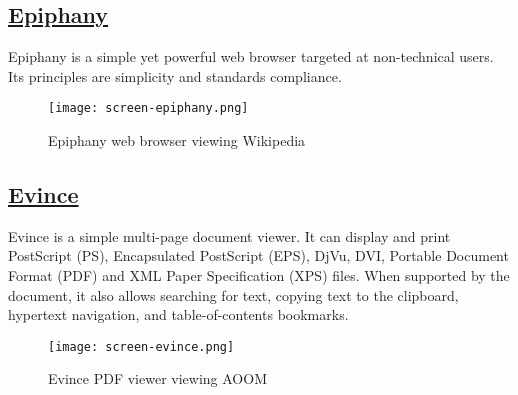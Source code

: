 %
% 
%

\subsection{\href{https://wiki.gnome.org/Apps/Web}{Epiphany}}

 Epiphany is a simple yet powerful web browser targeted at
 non-technical users. Its principles are simplicity and standards
 compliance.
 
\begin{figure}[h!]
\texttt{[image: screen-epiphany.png]}
 \caption{Epiphany web browser viewing Wikipedia}
 \label{fig:screen-epiphany}
\end{figure}

\subsection{\href{https://wiki.gnome.org/Apps/Evince}{Evince}}

 Evince is a simple multi-page document viewer.  It can display and print
 PostScript (PS), Encapsulated PostScript (EPS), DjVu, DVI, Portable
 Document Format (PDF) and XML Paper Specification (XPS) files.
 When supported by the document, it also allows searching for text,
 copying text to the clipboard, hypertext navigation, and
 table-of-contents bookmarks.

\begin{figure}[h!]
\texttt{[image: screen-evince.png]}
 \caption{Evince PDF viewer viewing AOOM}
 \label{fig:screen-evince}
\end{figure}

